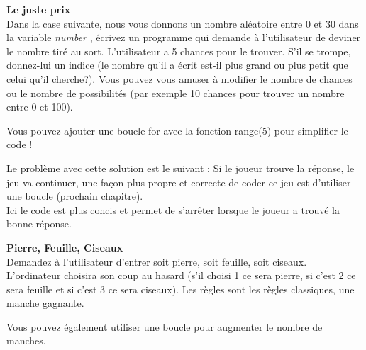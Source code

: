 \begin{Exercice}[20 minutes] \textbf{Le juste prix}\\
  Dans la case suivante, nous vous donnons un nombre aléatoire entre 0 et 30 dans la variable \textit{number} , écrivez un programme qui demande à l'utilisateur de deviner le nombre tiré au sort. L'utilisateur a 5 chances pour le trouver. S'il se trompe, donnez-lui un indice (le nombre qu'il a écrit est-il plus grand ou plus petit que celui qu'il cherche?). Vous pouvez vous amuser à modifier le nombre de chances ou le nombre de possibilités (par exemple 10 chances pour trouver un nombre entre 0 et 100).   \\
  
  
  
  
   
    \begin{conseil}
      	Vous pouvez ajouter une boucle for avec la fonction range(5) pour simplifier le code !
        
    \end{conseil}
    \begin{solution}
    
   
   
   Le problème avec cette solution est le suivant : Si le joueur trouve la réponse, le jeu va continuer, une façon plus propre et correcte de coder ce jeu est d'utiliser une boucle (prochain chapitre). \\
   
   
   
  	Ici le code est plus concis et permet de s'arrêter lorsque le joueur a trouvé la bonne réponse.\\
           
    \end{solution}   
\end{Exercice}

\newpage
\begin{Exercice}[20 minutes] \textbf{Pierre, Feuille, Ciseaux}\\
  Demandez à l'utilisateur d'entrer soit pierre, soit feuille, soit ciseaux. L'ordinateur choisira son coup au hasard (s'il choisi 1 ce sera pierre, si c'est 2 ce sera feuille et si c'est 3 ce sera ciseaux). Les règles sont les règles classiques, une manche gagnante.   \\
  
  
   
    \begin{solution}
    
    
    
    Vous pouvez également utiliser une boucle pour augmenter le nombre de manches. \\
           
    \end{solution}   
\end{Exercice}


